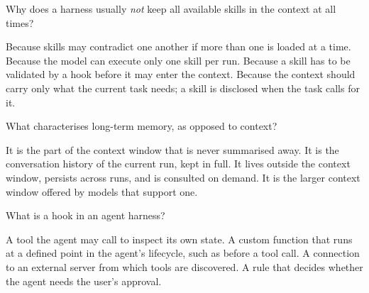 \begin{questions}
\qitem Why does a harness usually \emph{not} keep all available skills in the context at all times?
\begin{choices}
  \choice Because skills may contradict one another if more than one is loaded at a time.
  \choice Because the model can execute only one skill per run.
  \choice Because a skill has to be validated by a hook before it may enter the context.
  \CorrectChoice Because the context should carry only what the current task needs; a skill is disclosed when the task calls for it.
\end{choices}
\dontknow
{}


\qitem What characterises long-term memory, as opposed to context?
\begin{choices}
  \choice It is the part of the context window that is never summarised away.
  \choice It is the conversation history of the current run, kept in full.
  \CorrectChoice It lives outside the context window, persists across runs, and is consulted on demand.
  \choice It is the larger context window offered by models that support one.
\end{choices}
\dontknow
{}

\qitem What is a hook in an agent harness?
\begin{choices}
  \choice A tool the agent may call to inspect its own state.
  \CorrectChoice A custom function that runs at a defined point in the agent's lifecycle, such as before a tool call.
  \choice A connection to an external server from which tools are discovered.
  \choice A rule that decides whether the agent needs the user's approval.
\end{choices}
\dontknow
{}


\end{questions}
